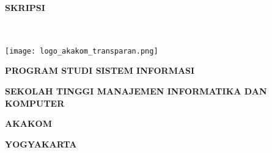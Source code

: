 \begin{center}
 \noindent
 {\Large \textbf{SKRIPSI}\\[1cm] }
 {\Large 
 	\textbf{\judulindo}\\[0.3cm]
	\textbf{\textit{\judulinggris}}\\[1cm]
 }
 \vspace{1cm}

 \texttt{[image: logo\_akakom\_transparan.png]}\\[2cm]

 \begin{minipage}[b]{0.75\linewidth}
 \begin{center} \normalsize

 \textsc{\nama}
 
 \textsc{\nim}

 \end{center}
 \end{minipage}

 \vspace{6\baselineskip}
 {\textbf{PROGRAM STUDI SISTEM INFORMASI}
 
 \textbf{SEKOLAH TINGGI MANAJEMEN INFORMATIKA DAN KOMPUTER}
 
 \textbf{AKAKOM}
 
 \textbf{YOGYAKARTA}
 
 \the\year{}
 }
 \end{center}


